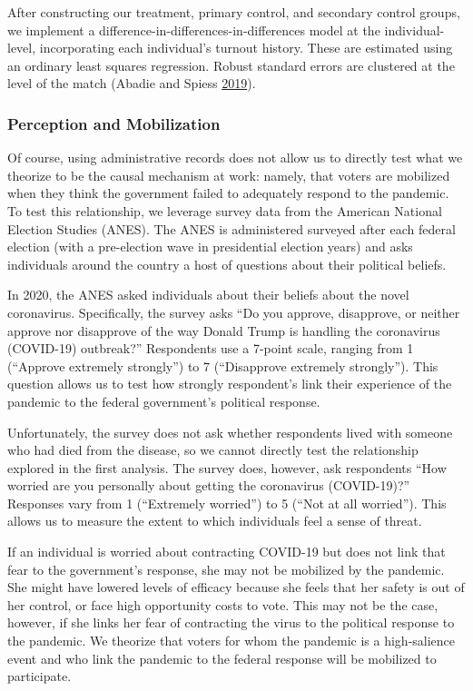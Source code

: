 \documentclass[
  12pt,
]{article}
\begin{document}
After constructing our treatment, primary control, and secondary control groups, we implement a difference-in-differences-in-differences model at the individual-level, incorporating each individual's turnout history. These are estimated using an ordinary least squares regression. Robust standard errors are clustered at the level of the match (Abadie and Spiess \protect\hyperlink{ref-Abadie2019}{2019}).

\hypertarget{perception-and-mobilization}{%
\subsubsection*{Perception and Mobilization}\label{perception-and-mobilization}}

Of course, using administrative records does not allow us to directly test what we theorize to be the causal mechanism at work: namely, that voters are mobilized when they think the government failed to adequately respond to the pandemic. To test this relationship, we leverage survey data from the American National Election Studies (ANES). The ANES is administered surveyed after each federal election (with a pre-election wave in presidential election years) and asks individuals around the country a host of questions about their political beliefs.

In 2020, the ANES asked individuals about their beliefs about the novel coronavirus. Specifically, the survey asks ``Do you approve, disapprove, or neither approve nor disapprove of the way Donald Trump is handling the coronavirus (COVID-19) outbreak?'' Respondents use a 7-point scale, ranging from 1 (``Approve extremely strongly'') to 7 (``Disapprove extremely strongly''). This question allows us to test how strongly respondent's link their experience of the pandemic to the federal government's political response.

Unfortunately, the survey does not ask whether respondents lived with someone who had died from the disease, so we cannot directly test the relationship explored in the first analysis. The survey does, however, ask respondents ``How worried are you personally about getting the coronavirus (COVID-19)?'' Responses vary from 1 (``Extremely worried'') to 5 (``Not at all worried''). This allows us to measure the extent to which individuals feel a sense of threat.

If an individual is worried about contracting COVID-19 but does not link that fear to the government's response, she may not be mobilized by the pandemic. She might have lowered levels of efficacy because she feels that her safety is out of her control, or face high opportunity costs to vote. This may not be the case, however, if she links her fear of contracting the virus to the political response to the pandemic. We theorize that voters for whom the pandemic is a high-salience event and who link the pandemic to the federal response will be mobilized to participate.
\end{document}
